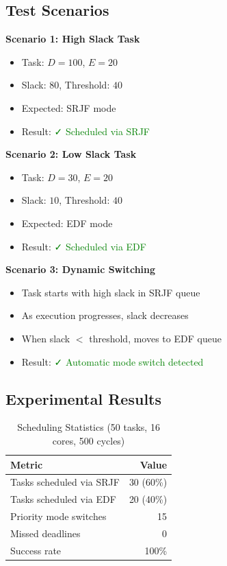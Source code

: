 \documentclass[conference]{IEEEtran}
\begin{document}
\subsection{Test Scenarios}

\textbf{Scenario 1: High Slack Task}
\begin{itemize}
    \item Task: $D=100$, $E=20$
    \item Slack: $80$, Threshold: $40$
    \item Expected: SRJF mode
    \item Result: \textcolor{green}{✓ Scheduled via SRJF}
\end{itemize}

\textbf{Scenario 2: Low Slack Task}
\begin{itemize}
    \item Task: $D=30$, $E=20$
    \item Slack: $10$, Threshold: $40$
    \item Expected: EDF mode
    \item Result: \textcolor{green}{✓ Scheduled via EDF}
\end{itemize}

\textbf{Scenario 3: Dynamic Switching}
\begin{itemize}
    \item Task starts with high slack in SRJF queue
    \item As execution progresses, slack decreases
    \item When slack $<$ threshold, moves to EDF queue
    \item Result: \textcolor{green}{✓ Automatic mode switch detected}
\end{itemize}

\subsection{Experimental Results}

\begin{table}[h]
\centering
\caption{Scheduling Statistics (50 tasks, 16 cores, 500 cycles)}
\begin{tabular}{|l|r|}
\hline
\textbf{Metric} & \textbf{Value} \\
\hline
Tasks scheduled via SRJF & 30 (60\%) \\
Tasks scheduled via EDF & 20 (40\%) \\
Priority mode switches & 15 \\
Missed deadlines & 0 \\
Success rate & 100\% \\
\hline
\end{tabular}
\end{table}
\end{document}
